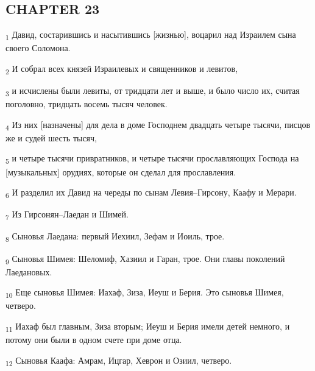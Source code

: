 \subsection{CHAPTER 23}
\begin{tcolorbox}
\textsubscript{1} Давид, состарившись и насытившись [жизнью], воцарил над Израилем сына своего Соломона.
\end{tcolorbox}
\begin{tcolorbox}
\textsubscript{2} И собрал всех князей Израилевых и священников и левитов,
\end{tcolorbox}
\begin{tcolorbox}
\textsubscript{3} и исчислены были левиты, от тридцати лет и выше, и было число их, считая поголовно, тридцать восемь тысяч человек.
\end{tcolorbox}
\begin{tcolorbox}
\textsubscript{4} Из них [назначены] для дела в доме Господнем двадцать четыре тысячи, писцов же и судей шесть тысяч,
\end{tcolorbox}
\begin{tcolorbox}
\textsubscript{5} и четыре тысячи привратников, и четыре тысячи прославляющих Господа на [музыкальных] орудиях, которые он сделал для прославления.
\end{tcolorbox}
\begin{tcolorbox}
\textsubscript{6} И разделил их Давид на череды по сынам Левия--Гирсону, Каафу и Мерари.
\end{tcolorbox}
\begin{tcolorbox}
\textsubscript{7} Из Гирсонян--Лаедан и Шимей.
\end{tcolorbox}
\begin{tcolorbox}
\textsubscript{8} Сыновья Лаедана: первый Иехиил, Зефам и Иоиль, трое.
\end{tcolorbox}
\begin{tcolorbox}
\textsubscript{9} Сыновья Шимея: Шеломиф, Хазиил и Гаран, трое. Они главы поколений Лаедановых.
\end{tcolorbox}
\begin{tcolorbox}
\textsubscript{10} Еще сыновья Шимея: Иахаф, Зиза, Иеуш и Берия. Это сыновья Шимея, четверо.
\end{tcolorbox}
\begin{tcolorbox}
\textsubscript{11} Иахаф был главным, Зиза вторым; Иеуш и Берия имели детей немного, и потому они были в одном счете при доме отца.
\end{tcolorbox}
\begin{tcolorbox}
\textsubscript{12} Сыновья Каафа: Амрам, Ицгар, Хеврон и Озиил, четверо.
\end{tcolorbox}
